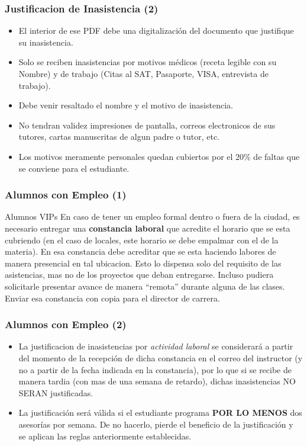 \begin{frame}
\frametitle{Justificacion de Inasistencia (2)}
\begin{itemize}
\item El interior de ese PDF debe una digitalización del documento que justifique su inasistencia.
\item Solo se reciben inasistencias por motivos médicos (receta legible con su Nombre) y de trabajo (Citas al SAT, Pasaporte, VISA, entrevista de trabajo).
\item Debe venir resaltado el nombre y el motivo de inasistencia.
\item No tendran validez impresiones de pantalla, correos electronicos de sus tutores, cartas manuscritas de algun padre o tutor, etc.
\item Los motivos meramente personales quedan cubiertos por el 20\% de faltas que se conviene para el estudiante. 
\end{itemize}
\end{frame}




\begin{frame}
\frametitle{Alumnos con Empleo (1)}

\begin{block}{Alumnos VIPs}
En caso de tener un empleo formal dentro o fuera de la ciudad, es necesario entregar una \textbf{constancia laboral} que acredite el horario que se esta cubriendo (en el caso de locales, este horario se debe empalmar con el de la materia). En esa constancia debe acreditar que se esta haciendo labores de manera presencial en tal ubicacion. Esto lo dispensa solo del requisito de las asistencias, mas no de los proyectos que deban entregarse. Incluso pudiera solicitarle presentar avance de manera ``remota'' durante alguna de las clases. Enviar esa constancia con copia para el director de carrera.
\end{block}
\end{frame}


\begin{frame}
\frametitle{Alumnos con Empleo (2)}
\begin{itemize}
\item La justificacion de inasistencias por \textit{actividad laboral} se considerar\'a a partir del momento de la recepci\'on de dicha constancia en el correo del instructor (y no a partir de la fecha indicada en la constancia), por lo que si se recibe de manera tardia (con mas de una semana de retardo), dichas inasistencias NO SERAN justificadas.
\item La justificación será válida si el estudiante programa \textbf{POR LO MENOS} dos asesorías por semana. De no hacerlo, pierde el beneficio de la justificación y se aplican las reglas anteriormente establecidas. 
\end{itemize}

\end{frame}






